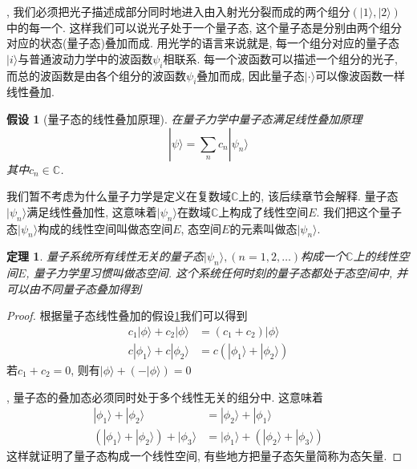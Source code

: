 \documentclass[a4paper,11pt]{book}
\newtheorem{theorem}{\hspace{2em}定理}[section]
\newtheorem{proof}{证明}[section]
\newtheorem{hypothesis}{假设}[section]
\begin{document}
, 我们必须把光子描述成部分同时地进入由入射光分裂而成的两个组分$(|1\rangle,|2\rangle)$中的每一个. 这样我们可以说光子处于一个量子态, 这个量子态是分别由两个组分对应的状态(量子态)叠加而成. 用光学的语言来说就是, 每一个组分对应的量子态$|i\rangle$与普通波动力学中的波函数$\psi_i$相联系. 每一个波函数可以描述一个组分的光子, 而总的波函数是由各个组分的波函数$\psi_i$叠加而成, 因此量子态$|\cdot\rangle$可以像波函数一样线性叠加.

\begin{hypothesis}[量子态的线性叠加原理]\label{Superposition hypothesis}
  在量子力学中量子态满足线性叠加原理
\begin{equation*}
  |\psi\rangle=\sum_{n}c_n|\psi_n\rangle
\end{equation*}
其中$c_n\in\mathbb{C}$.
\end{hypothesis}
我们暂不考虑为什么量子力学是定义在复数域$\mathbb{C}$上的, 该后续章节会解释. 量子态$|\psi_n\rangle$满足线性叠加性, 这意味着$|\psi_n\rangle$在数域$\mathbb{C}$上构成了线性空间$E$. 我们把这个量子态$|\psi_n\rangle$构成的线性空间叫做态空间$E$, 态空间$E$的元素叫做态$|\psi_n\rangle$.
\begin{theorem}
  量子系统所有线性无关的量子态$|\psi_n\rangle,(n=1,2,\dots)$构成一个$\mathbb{C}$上的线性空间$E$, 量子力学里习惯叫做态空间. 这个系统任何时刻的量子态都处于态空间中, 并可以由不同量子态叠加得到
\end{theorem}
\begin{proof}
  根据量子态线性叠加的假设\ref{Superposition hypothesis}我们可以得到
\begin{equation*}
  \begin{split}
     c_1|\phi\rangle+c_2|\phi\rangle&=(c_1+c_2)|\phi\rangle \\
     c|\phi_1\rangle+c|\phi_2\rangle&=c(|\phi_1\rangle+|\phi_2\rangle)
  \end{split}
\end{equation*}
若$c_1+c_2=0$, 则有$|\phi\rangle+(-|\phi\rangle)=0$

, 量子态的叠加态必须同时处于多个线性无关的组分中. 这意味着
\begin{equation*}
  \begin{split}
     |\phi_1\rangle+|\phi_2\rangle&=|\phi_2\rangle+|\phi_1\rangle\\
     (|\phi_1\rangle+|\phi_2\rangle)+|\phi_3\rangle&=|\phi_1\rangle+(|\phi_2\rangle+|\phi_3\rangle)
  \end{split}
\end{equation*}
这样就证明了量子态构成一个线性空间, 有些地方把量子态矢量简称为态矢量.
\end{proof}
\end{document}
